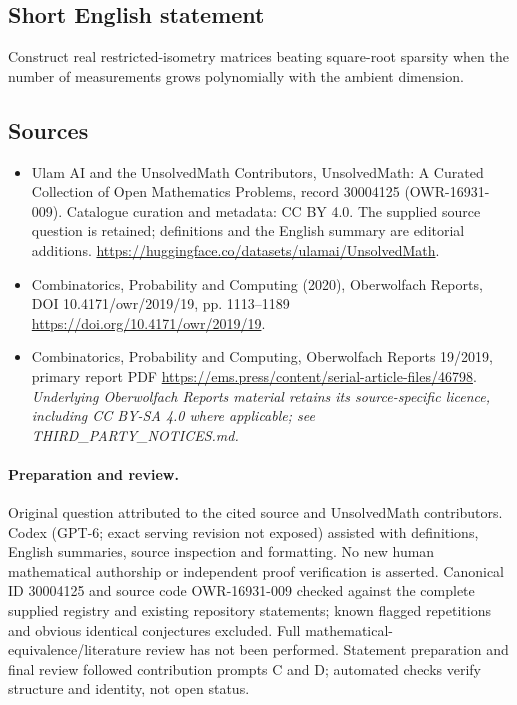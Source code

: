 \documentclass[11pt]{article}
\begin{document}
\subsection{Short English statement}
Construct real restricted-isometry matrices beating square-root sparsity when the number of measurements grows polynomially with the ambient dimension.
\subsection{Sources}
\begin{itemize}
\item[\hypertarget{source:30004125:1}{S1}] Ulam AI and the UnsolvedMath Contributors, UnsolvedMath: A Curated Collection of Open Mathematics Problems, record 30004125 (OWR-16931-009). Catalogue curation and metadata: CC BY 4.0. The supplied source question is retained; definitions and the English summary are editorial additions.
\url{https://huggingface.co/datasets/ulamai/UnsolvedMath}.
\item[\hypertarget{source:30004125:2}{S2}] Combinatorics, Probability and Computing (2020), Oberwolfach Reports, DOI 10.4171/owr/2019/19, pp. 1113--1189
\url{https://doi.org/10.4171/owr/2019/19}.
\item[\hypertarget{source:30004125:3}{S3}] Combinatorics, Probability and Computing, Oberwolfach Reports 19/2019, primary report PDF
\url{https://ems.press/content/serial-article-files/46798}.
\textit{Underlying Oberwolfach Reports material retains its source-specific licence, including CC BY-SA 4.0 where applicable; see THIRD\_PARTY\_NOTICES.md.}
\end{itemize}
\paragraph{Preparation and review.}
Original question attributed to the cited source and UnsolvedMath contributors. Codex (GPT-6; exact serving revision not exposed) assisted with definitions, English summaries, source inspection and formatting. No new human mathematical authorship or independent proof verification is asserted. Canonical ID 30004125 and source code OWR-16931-009 checked against the complete supplied registry and existing repository statements; known flagged repetitions and obvious identical conjectures excluded. Full mathematical-equivalence/literature review has not been performed. Statement preparation and final review followed contribution prompts C and D; automated checks verify structure and identity, not open status.
\label{end:30004125}
\end{document}
